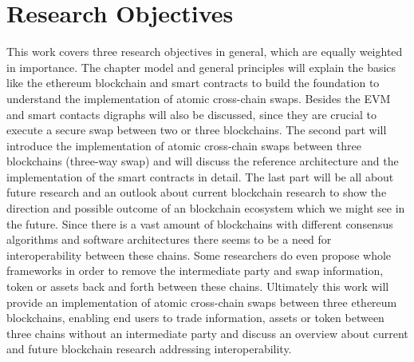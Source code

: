 %
%
\section{Research Objectives}
\label{sec:intro:goal}
This work covers three research objectives in general, which are equally weighted in importance. The chapter model and general principles will explain the basics like the ethereum blockchain and smart contracts to build the foundation to understand the implementation of atomic cross-chain swaps. Besides the \ac{EVM} and smart contacts digraphs will also be discussed, since they are crucial to execute a secure swap between two or three blockchains. The second part will introduce the implementation of atomic cross-chain swaps between three blockchains (three-way swap) and will discuss the reference architecture and the implementation of the smart contracts in detail. The last part will be all about future research and an outlook about current blockchain research to show the direction and possible outcome of an blockchain ecosystem which we might see in the future. Since there is a vast amount of blockchains with different consensus algorithms and software architectures there seems to be a need for interoperability between these chains. Some researchers do even propose whole frameworks in order to remove the intermediate party and swap information, token or assets back and forth between these chains. Ultimately this work will provide an implementation of atomic cross-chain swaps between three ethereum blockchains, enabling end users to trade information, assets or token between three chains without an intermediate party and discuss an overview about current and future blockchain research addressing interoperability.



